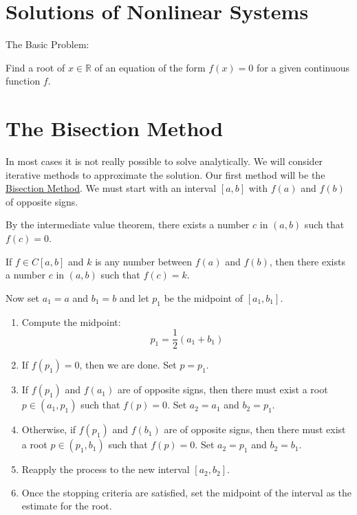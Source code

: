 \section{Solutions of Nonlinear Systems}

The Basic Problem:

Find a root of $x\in\mathbb{R}$ of an equation of the form $f(x)=0$ for a
given continuous function $f$.

\section{The Bisection Method}

In most cases it is not really possible to solve analytically. We will consider
iterative methods to approximate the solution. Our first method will be the
\uline{Bisection Method}. We must start with an interval $[a, b]$ with 
$f(a)$ and $f(b)$ of opposite signs.

By the intermediate value theorem, there exists a number $c$ in $(a, b)$ such that
$f(c)=0$.

\thm If $f\in C[a,b]$ and $k$ is any number between $f(a)$ and $f(b)$, then
there exists a number $c$ in $(a, b)$ such that $f(c)=k$.

Now set $a_1 = a$ and $b_1 = b$ and let $p_1$ be the midpoint of $[a_1, b_1]$.

\begin{enumerate}
    \item Compute the midpoint:
    \begin{equation*}
        p_1 = \frac{1}{2} (a_1 + b_1)
    \end{equation*}
    
    \item If $f(p_1) = 0$, then we are done. Set $p = p_1$.
    
    \item If $f(p_1)$ and $f(a_1)$ are of opposite signs, then there must exist 
          a root $p \in (a_1, p_1)$ such that $f(p) = 0$. Set $a_2 = a_1$ and 
          $b_2 = p_1$.
    
    \item Otherwise, if $f(p_1)$ and $f(b_1)$ are of opposite signs, then there 
          must exist a root $p \in (p_1, b_1)$ such that $f(p) = 0$. Set 
          $a_2 = p_1$ and $b_2 = b_1$.
    
    \item Reapply the process to the new interval $[a_2, b_2]$.
    
    \item Once the stopping criteria are satisfied, set the midpoint of the 
          interval as the estimate for the root.
\end{enumerate}

